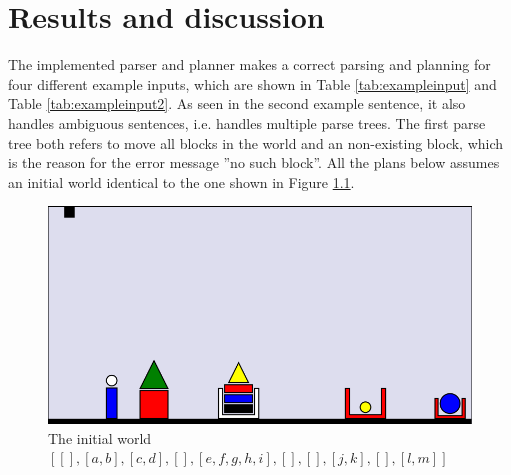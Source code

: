 \chapter{Results and discussion}
The implemented parser and planner makes a correct parsing and planning for
four different example inputs, which are shown in Table \ref{tab:exampleinput}
and Table \ref{tab:exampleinput2}. As seen in the second example sentence, it
also handles ambiguous sentences, i.e. handles multiple parse trees. The first
parse tree both refers to move all blocks in the world and an non-existing
block, which is the reason for the error message ''no such block''. All the
plans below assumes an initial world identical to the one shown in 
Figure \ref{fig:initworld}.\\
\begin{figure}[h!]
\centering
\includegraphics[scale = 0.4]{fig/1.png}
\caption{The initial world\\ $[[],[a,b],[c,d], [], [e,f,g,h,i],[],[],[j,k], [], [l,m]]$}
\label{fig:initworld}
\end{figure}\\

